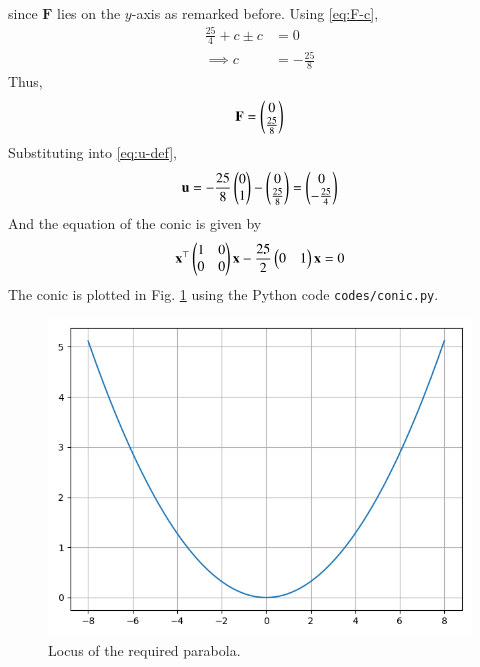 \documentclass[journal,12pt,twocolumn]{IEEEtran}
\renewcommand{\vec}[1]{\boldsymbol{\mathbf{#1}}}
\begin{document}
\begin{enumerate}
\begin{align}
    \end{align}
    since $\vec{F}$ lies on the $y$-axis as remarked before. Using 
    \eqref{eq:F-c},
    \begin{align}
        \frac{25}{4}+c\pm c &= 0 \\
        \implies c &= -\frac{25}{8}
    \end{align}
    Thus,
    \begin{align}
        \vec{F} = \myvec{0\\\frac{25}{8}}
    \end{align}
    Substituting into \eqref{eq:u-def},
    \begin{align}
        \vec{u} = -\frac{25}{8}\myvec{0\\1} - \myvec{0\\\frac{25}{8}} = \myvec{0\\-\frac{25}{4}}
    \end{align}
    And the equation of the conic is given by
    \begin{align}
        \vec{x}^\top\myvec{1&0\\0&0}\vec{x} - \frac{25}{2}\myvec{0&1}\vec{x} = 0
    \end{align}
    The conic is plotted in Fig. \ref{fig:conic} using the Python code 
    \texttt{codes/conic.py}.
    \begin{figure}[!ht]
        \centering
        \includegraphics[width=\columnwidth]{figs/conic.png}
        \caption{Locus of the required parabola.}
        \label{fig:conic}
    \end{figure}
\end{enumerate}
\end{document}
